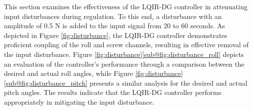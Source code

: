 \documentclass[3p,times]{elsarticle}
\begin{document}
\noindent This section examines the effectiveness of the LQIR-DG controller in attenuating input disturbances during regulation. To this end, a disturbance with an amplitude of 0.5 N is added to the input signal from 20 to 60 seconds. As depicted in Figure \ref{fig:disturbance}, the LQIR-DG controller demonstrates proficient coupling of the roll and screw channels, resulting in effective removal of the input disturbance. Figure \ref{fig:disturbance}\ref{sub@fig:disturbance_roll} depicts an evaluation of the controller's performance through a comparison between the desired and actual roll angles, while Figure \ref{fig:disturbance}\ref{sub@fig:disturbance_pitch} presents a similar analysis for the desired and actual pitch angles. The results indicate that the LQIR-DG controller performs appropriately in mitigating the input disturbance.
\end{document}
